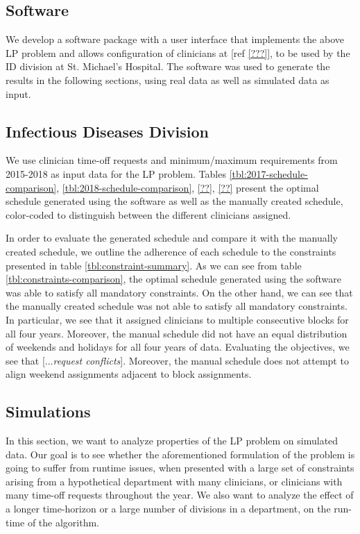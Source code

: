 \subsection{Software}
We develop a software package with a user interface that implements the above LP problem and allows configuration of clinicians at [ref \ref{???}], to be used by the ID division at St. Michael's Hospital. The software was used to generate the results in the following sections, using real data as well as simulated data as input.

\subsection{Infectious Diseases Division}
We use clinician time-off requests and minimum/maximum requirements from 2015-2018 as input data for the LP problem. Tables \ref{tbl:2017-schedule-comparison}, \ref{tbl:2018-schedule-comparison}, \ref{??}, \ref{??} present the optimal schedule generated using the software as well as the manually created schedule, color-coded to distinguish between the different clinicians assigned.




In order to evaluate the generated schedule and compare it with the manually created schedule, we outline the adherence of each schedule to the constraints presented in table \ref{tbl:constraint-summary}. As we can see from table \ref{tbl:constraints-comparison}, the optimal schedule generated using the software was able to satisfy all mandatory constraints. On the other hand, we can see that the manually created schedule was not able to satisfy all mandatory constraints. In particular, we see that it assigned clinicians to multiple consecutive blocks for all four years. Moreover, the manual schedule did not have an equal distribution of weekends and holidays for all four years of data. Evaluating the objectives, we see that [...\textit{request conflicts}]. Moreover, the manual schedule does not attempt to align weekend assignments adjacent to block assignments.



\subsection{Simulations}
In this section, we want to analyze properties of the LP problem on simulated data. Our goal is to see whether the aforementioned formulation of the problem is going to suffer from runtime issues, when presented with a large set of constraints arising from a hypothetical department with many clinicians, or clinicians with many time-off requests throughout the year. We also want to analyze the effect of a longer time-horizon or a large number of divisions in a department, on the run-time of the algorithm. \\

